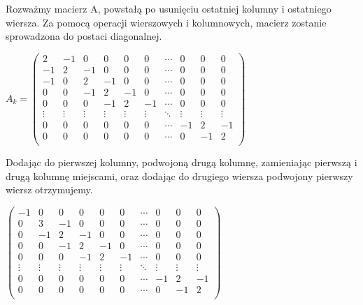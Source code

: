 Rozważmy macierz A, powstałą po usunięciu ostatniej kolumny i ostatniego wiersza. Za pomocą operacji wierszowych i kolumnowych, macierz zostanie sprowadzona do postaci diagonalnej.
\begin{center}

$A_{k}=\begin{pmatrix}
2  & -1 &  0 & 0 & 0 & 0 & \cdots & 0 & 0 & 0 \\
-1 &  2 & -1 & 0 & 0 & 0 & \cdots & 0 & 0 & 0 \\
-1 &  0 &  2 &-1 & 0 & 0 & \cdots & 0 & 0 & 0 \\
 0 &  0 & -1 & 2 &-1 & 0 & \cdots & 0 & 0 & 0 \\
 0 &  0 &  0 &-1 & 2 &-1 & \cdots & 0 & 0 & 0 \\
 \vdots  &  \vdots &  \vdots &  \vdots &  \vdots &  \vdots & \ddots &  \vdots   & \vdots   &  \vdots\\
 0 &  0 &  0 & 0 & 0 & 0 & \cdots &-1 & 2 &-1 \\
 0 &  0 &  0 & 0 & 0 &0  & \cdots & 0 &-1 & 2 \\
\end{pmatrix}$

\end{center}
Dodając do pierwszej kolumny, podwojoną drugą kolumnę, zamieniając pierwszą i drugą kolumnę miejscami, oraz dodając do drugiego wiersza podwojony pierwszy wiersz otrzymujemy. 
 \begin{center}
 

$\begin{pmatrix}
-1 &  0 &  0 & 0 & 0 & 0 & \cdots & 0 & 0 & 0 \\
 0 &  3 & -1 & 0 & 0 & 0 & \cdots & 0 & 0 & 0 \\
 0 & -1 &  2 &-1 & 0 & 0 & \cdots & 0 & 0 & 0 \\
 0 &  0 & -1 & 2 &-1 & 0 & \cdots & 0 & 0 & 0 \\
 0 &  0 &  0 &-1 & 2 &-1 & \cdots & 0 & 0 & 0 \\
 \vdots  &  \vdots &  \vdots &  \vdots &  \vdots &  \vdots & \ddots &  \vdots   & \vdots   &  \vdots\\
 0 &  0 &  0 & 0 & 0 & 0 & \cdots &-1 & 2 &-1 \\
 0 &  0 &  0 & 0 & 0 &0  & \cdots & 0 &-1 & 2 \\
\end{pmatrix}$
 \end{center}
 

